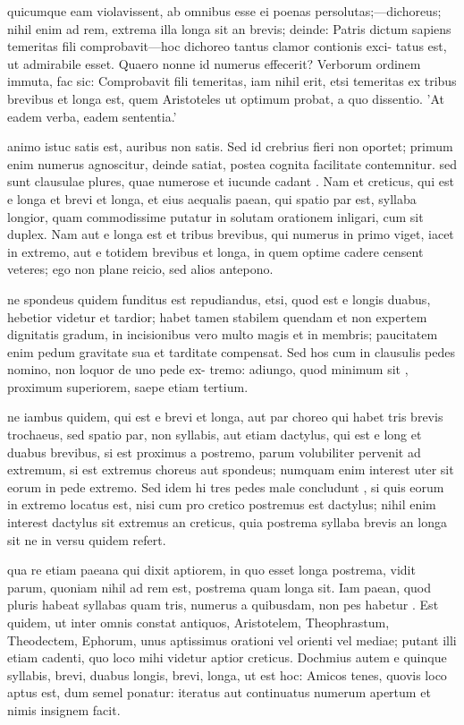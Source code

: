  quicumque eam violavissent, ab omnibus esse ei poenas persolutas;—dichoreus; nihil enim ad rem, extrema illa longa sit an brevis; deinde: Patris dictum sapiens temeritas fili comprobavit—hoc dichoreo tantus clamor contionis exci- tatus est, ut admirabile esset. Quaero nonne id numerus effecerit? Verborum ordinem immuta, fac sic: Comprobavit fili temeritas, iam nihil erit, etsi temeritas ex tribus brevibus et longa est, quem Aristoteles ut optimum probat, a quo dissentio. 'At eadem verba, eadem sententia.'

 animo istuc satis est, auribus non satis. Sed id crebrius fieri non oportet; primum enim numerus agnoscitur, deinde satiat, postea cognita facilitate contemnitur. sed sunt clausulae plures, quae numerose et iucunde cadant . Nam et creticus, qui est e longa et brevi et longa, et eius aequalis paean, qui spatio par est, syllaba longior, quam commodissime putatur in solutam orationem inligari, cum sit duplex. Nam aut e longa est et tribus brevibus, qui numerus in primo viget, iacet in extremo, aut e totidem brevibus et longa, in quem optime cadere censent veteres; ego non plane reicio, sed alios antepono.

 ne spondeus quidem funditus est repudiandus, etsi, quod est e longis duabus, hebetior videtur et tardior; habet tamen stabilem quendam et non expertem dignitatis gradum, in incisionibus vero multo magis et in membris; paucitatem enim pedum gravitate sua et tarditate compensat. Sed hos cum in clausulis pedes nomino, non loquor de uno pede ex- tremo: adiungo, quod minimum sit , proximum superiorem, saepe etiam tertium.

 ne iambus quidem, qui est e brevi et longa, aut par choreo qui habet tris brevis trochaeus, sed spatio par, non syllabis, aut etiam dactylus, qui est e long et duabus brevibus, si est proximus a postremo, parum volubiliter pervenit ad extremum, si est extremus choreus aut spondeus; numquam enim interest uter sit eorum in pede extremo. Sed idem hi tres pedes male concludunt , si quis eorum in extremo locatus est, nisi cum pro cretico postremus est dactylus; nihil enim interest dactylus sit extremus an creticus, quia postrema syllaba brevis an longa sit ne in versu quidem refert.

 qua re etiam paeana qui dixit aptiorem, in quo esset longa postrema, vidit parum, quoniam nihil ad rem est, postrema quam longa sit. Iam paean, quod pluris habeat syllabas quam tris, numerus a quibusdam, non pes habetur . Est quidem, ut inter omnis constat antiquos, Aristotelem, Theophrastum, Theodectem, Ephorum, unus aptissimus orationi vel orienti vel mediae; putant illi etiam cadenti, quo loco mihi videtur aptior creticus. Dochmius autem e quinque syllabis, brevi, duabus longis, brevi, longa, ut est hoc: Amicos tenes, quovis loco aptus est, dum semel ponatur: iteratus aut continuatus numerum apertum et nimis insignem facit.

